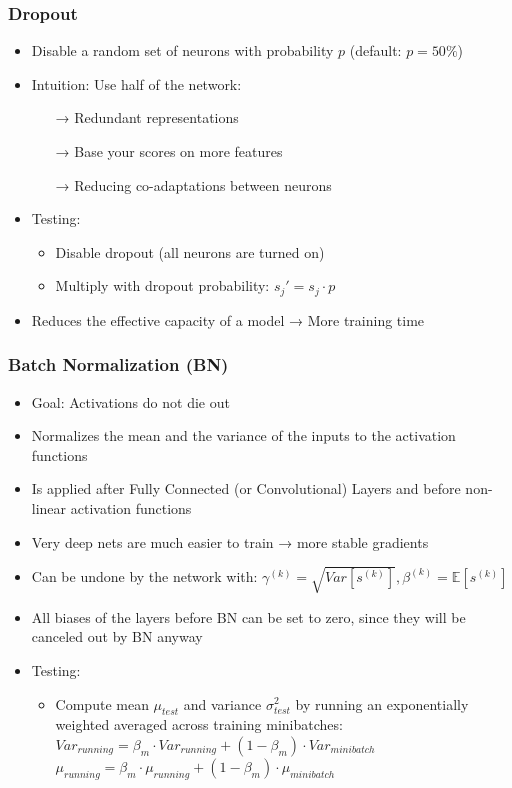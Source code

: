 \documentclass[10pt,a4paper]{article}
\newcommand{\cons}{\textcolor{red}{\textbf{\textendash}}}
\newcommand{\pros}{\textcolor{green}{\textbf{+}}}
\newcommand{\props}{$\circ$}
\newcommand{\icons}{\item[\cons]}
\newcommand{\ipros}{\item[\pros]}
\newcommand{\iprops}{\item[\props]}
\begin{document}
\subsubsection{Dropout}
\begin{itemize}
	\item Disable a random set of neurons with probability $p$ (default: $p = 50 \%$)
	\iprops Intuition: Use half of the network:
	\begin{itemize}
		\item[→] Redundant representations
		\item[→] Base your scores on more features
		\item[→] Reducing co-adaptations between neurons
	\end{itemize}
	\item Testing:
	\begin{itemize}
		\item Disable dropout (all neurons are turned on)
		\item Multiply with dropout probability: $s_j' = s_j ⋅ p$
	\end{itemize}
	\icons Reduces the effective capacity of a model → More training time
\end{itemize}

\subsubsection{Batch Normalization (BN)}
\begin{itemize}
	\item Goal: Activations do not die out
	\item Normalizes the mean and the variance of the inputs to the activation functions
	\item Is applied after Fully Connected (or Convolutional) Layers and before non-linear activation functions
	\ipros Very deep nets are much easier to train → more stable gradients
	\iprops Can be undone by the network with: $\gamma^{(k)} = \sqrt{Var[s^{(k)}]}, \beta^{(k)} = \mathbb E[s^{(k)}]$
	\iprops All biases of the layers before BN can be set to zero, since they will be canceled out by BN anyway
	\item Testing:
	\begin{itemize}
		\item Compute mean $\mu_{test}$ and variance $\sigma^2_{test}$ by running an exponentially weighted averaged across training minibatches: \\
		$Var_{running} = \beta_m ⋅ Var_{running} + (1 - \beta_m) ⋅ Var_{minibatch}$ \\
		$\mu_{running} = \beta_m ⋅ \mu_{running} + (1 - \beta_m) ⋅ \mu_{minibatch}$ \\
	\end{itemize}
\end{itemize}
\end{document}
